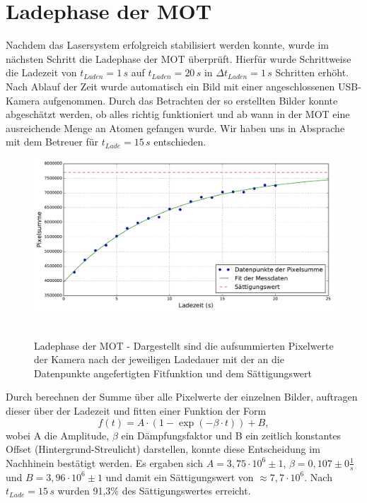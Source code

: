 \documentclass[twoside,colorback,accentcolor=tud4c,11pt]{tudreport}
\begin{document}
\section{Ladephase der MOT}
Nachdem das Lasersystem erfolgreich stabilisiert werden konnte, wurde im nächsten Schritt die Ladephase der MOT überprüft. Hierfür wurde Schrittweise die Ladezeit von $t_{Laden}=1\,\si{s}$ auf $t_{Laden}=20\,\si{s}$ in $\Delta t_{Laden}=1\,\si{s}$ Schritten erhöht. Nach Ablauf der Zeit wurde automatisch ein Bild mit einer angeschlossenen USB-Kamera aufgenommen. Durch das Betrachten der so erstellten Bilder konnte abgeschätzt werden, ob alles richtig funktioniert und ab wann in der MOT eine ausreichende Menge an Atomen gefangen wurde. Wir haben uns in Absprache mit dem Betreuer für $t_{Lade}=15\,\si{s}$ entschieden. 
\begin{figure}[H]
\centering
   	\begin{minipage}[b]{0.85\textwidth}
   	\includegraphics[width=\textwidth]{graphics/laden.pdf}\
   	\end{minipage}
\caption{Ladephase der MOT - Dargestellt sind die aufsummierten Pixelwerte der Kamera nach der jeweiligen Ladedauer mit der an die Datenpunkte angefertigten Fitfunktion und dem Sättigungswert}\label{laden}	
\end{figure}
Durch berechnen der Summe über alle Pixelwerte der einzelnen Bilder, auftragen dieser über der Ladezeit und fitten einer Funktion der Form
\begin{equation}
f(t)=A\cdot\left(1-\exp\left(-\beta\cdot t\right)\right) + B,
\end{equation}
wobei A die Amplitude, $\beta$ ein Dämpfungsfaktor und B ein zeitlich konstantes Offset (Hintergrund-Streulicht) darstellen, konnte diese Entscheidung im Nachhinein bestätigt werden. Es ergaben sich $A=3,75\cdot 10^6 \pm 1$, $\beta=0,107\pm 0 \frac{1}{s}$ und $B=3,96\cdot 10^6 \pm 1$ und damit ein Sättigungswert von $\approx7,7\cdot 10^6$. Nach $t_{Lade}=15\,\si{s}$ wurden 91,3\% des Sättigungswertes erreicht.
\end{document}
